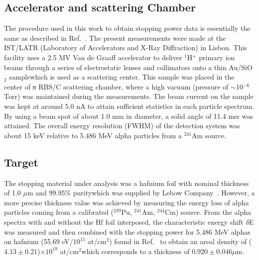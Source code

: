 \documentclass[aps,pra,reprint,superscriptaddress]{revtex4-1} %
\providecommand{\DIFadd}[1]{{\protect\color{blue}\uwave{#1}}} %
\providecommand{\DIFdel}[1]{{\protect\color{red}\sout{#1}}}                      %
\providecommand{\DIFaddbegin}{} %
\providecommand{\DIFaddend}{} %
\providecommand{\DIFdelbegin}{} %
\providecommand{\DIFdelend}{} %
\newcommand{\DIFscaledelfig}{0.5}
\newlength{\DIFdelgraphicswidth} %
\newlength{\DIFdelgraphicsheight} %
\newcommand{\DIFaddincludegraphics}[2][]{{\color{blue}\fbox{\DIFOincludegraphics[#1]{#2}}}} %
\newcommand{\DIFdelincludegraphics}[2][]{%
\sbox{\DIFdelgraphicsbox}{\DIFOincludegraphics[#1]{#2}}%
\settoboxwidth{\DIFdelgraphicswidth}{\DIFdelgraphicsbox} %
\settoboxtotalheight{\DIFdelgraphicsheight}{\DIFdelgraphicsbox} %
\scalebox{\DIFscaledelfig}{%
\parbox[b]{\DIFdelgraphicswidth}{\usebox{\DIFdelgraphicsbox}\\[-\baselineskip] \rule{\DIFdelgraphicswidth}{0em}}\llap{\resizebox{\DIFdelgraphicswidth}{\DIFdelgraphicsheight}{%
\setlength{\unitlength}{\DIFdelgraphicswidth}%
\begin{picture}(1,1)%
\thicklines\linethickness{2pt} %
{\color[rgb]{1,0,0}\put(0,0){\framebox(1,1){}}}%
{\color[rgb]{1,0,0}\put(0,0){\line( 1,1){1}}}%
{\color[rgb]{1,0,0}\put(0,1){\line(1,-1){1}}}%
\end{picture}%
}\hspace*{3pt}}} %
} %
\DeclareRobustCommand{\DIFaddbegin}{\DIFOaddbegin \let\includegraphics\DIFaddincludegraphics} %
\DeclareRobustCommand{\DIFaddend}{\DIFOaddend \let\includegraphics\DIFOincludegraphics} %
\DeclareRobustCommand{\DIFdelbegin}{\DIFOdelbegin \let\includegraphics\DIFdelincludegraphics} %
\DeclareRobustCommand{\DIFdelend}{\DIFOaddend \let\includegraphics\DIFOincludegraphics} %
\begin{document}
\DIFaddend \subsection{Accelerator and scattering Chamber}
The procedure used in this work to obtain stopping power data is 
essentially the same as described in Ref.~\cite{Miranda01}. The present 
measurements were made at the IST/LATR (Laboratory of Accelerators and 
X-Ray Diffraction) in Lisbon. This facility uses a 2.5 MV Van de Graaff 
accelerator to deliver $^1$H$^+$ primary ion beams through a series of 
electrostatic lenses and collimators onto a thin Au/SiO$_2$ sample\DIFaddbegin \DIFadd{, 
}\DIFaddend which is used as a scattering center. This sample was placed in the 
center of \DIFdelbegin \DIFdel{a }\DIFdelend \DIFaddbegin \DIFadd{an }\DIFaddend RBS/C scattering chamber, where a high vacuum (pressure of 
$\sim$10$^{-6}$ Torr) was maintained during the measurements. The beam 
current on the sample was kept at around 5.0 nA to attain sufficient 
statistics in each particle spectrum. By using a beam spot of about 
1.0 mm in diameter, a solid angle of 11.4 msr was attained. The overall 
energy resolution (FWHM) of the detection system was about 15 keV 
relative to 5.486 MeV alpha particles from a $^{241}$Am source.

\subsection{Target}
The stopping material under analysis was a hafnium foil with \DIFaddbegin \DIFadd{a }\DIFaddend nominal 
thickness of 1.0 $\mu$m and 99.95\% purity\DIFaddbegin \DIFadd{, }\DIFaddend which was supplied by Lebow 
Company~\cite{Lebow}. However, a more precise thickness value was 
achieved by measuring the energy loss of alpha particles coming from a 
calibrated ($^{239}$Pu, $^{241}$Am, $^{244}$Cm) source. From the alpha 
spectra with and without the Hf foil interposed, the characteristic 
energy shift $\delta$E was measured and then combined with the stopping 
power for 5.486 MeV alphas on hafnium (55.69 eV/$10^{15}$ at/cm$^2$) 
found in Ref.~\cite{Ziegler01} to obtain an areal density of 
($4.13 \pm 0.21$)$\times 10^{19}$ at/cm$^2$\DIFaddbegin \DIFadd{, }\DIFaddend which corresponds to a 
thickness of $0.920\pm0.046 \mu$m.
\DIFaddbegin 
\end{document}
